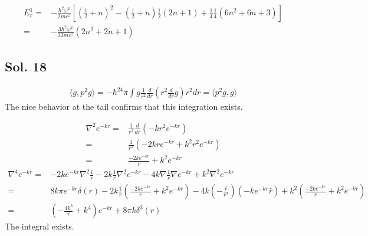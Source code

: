 \begin{align*}
     E^1_r = &
     -\frac{\hbar^2\omega^2}{2mc^2}[(\frac{1}{2}+n)^2-(\frac{1}{2}+n)
     \frac{1}{2}(2n+1)+
     \frac{1}{4}
     \frac{1}{4}(6n^2+6n+3)]\\
     =&-\frac{3\hbar^2\omega^2}{32mc^2}(2n^2+2n+1)
\end{align*}

\subsection*{Sol. 18}
\begin{align*}
    \langle g, p^2g\rangle=
    -\hbar^24\pi\int 
    g\frac{1}{r^2}\frac{d}{dr}(r^2\frac{d}{dr}g) r^2 dr
    =\langle p^2g, g\rangle
\end{align*}
The nice behavior at the tail confirms that this integration exists.

\begin{align*}
    \nabla^2e^{-kr}
    =&\frac{1}{r^2}\frac{d}{dr}(-kr^2e^{-kr})\\
    =&\frac{1}{r^2}(-2kre^{-kr}+k^2r^2e^{-kr})\\
    =&\frac{-2ke^{-kr}}{r}+k^2e^{-kr}
\end{align*}
\begin{align*}
    \nabla^4e^{-kr}
    =&-2ke^{-kr}\nabla^2\frac{1}{r}
    -2k\frac{1}{r}\nabla^2e^{-kr}
    -4k\nabla \frac{1}{r} \nabla e^{-kr}
    +k^2\nabla^2 e^{-kr}\\
    =&8k\pi e^{-kr}\delta(r)
    -2k\frac{1}{r}
    \left(\frac{-2ke^{-kr}}{r}+k^2e^{-kr}\right)
    -4k(-\frac{\hat r}{r^2})(-ke^{-kr}\hat r)
    +k^2\left(\frac{-2ke^{-kr}}{r}+k^2e^{-kr}\right)\\
    =&\left(-\frac{4k^3}{r}+k^4\right)e^{-kr}+8\pi k\delta^3(r)
\end{align*}
The integral exists.

